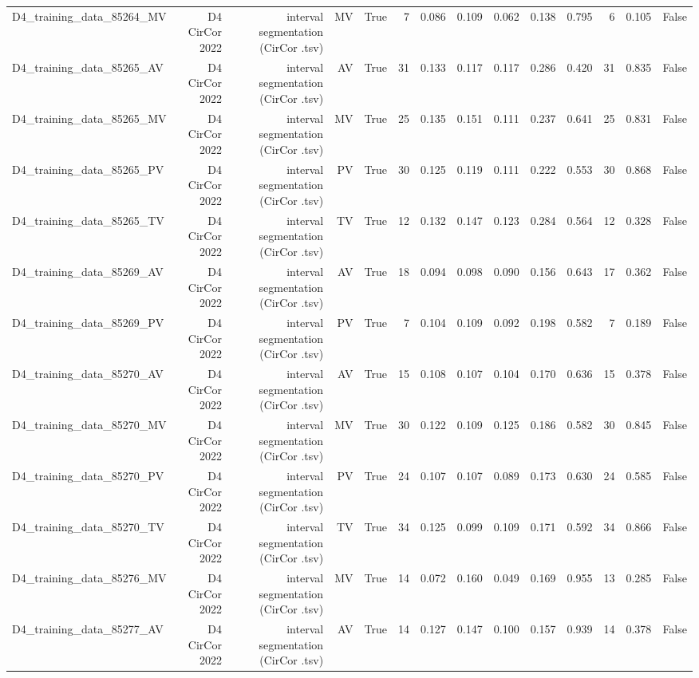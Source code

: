 \begin{table}[htbp]
\begin{tabular}{lrrrrrrrrrrrrr}
    D4\_training\_data\_85264\_MV & D4 CirCor 2022 & interval segmentation (CirCor .tsv) & MV & True & 7 & 0.086 & 0.109 & 0.062 & 0.138 & 0.795 & 6 & 0.105 & False \\
    D4\_training\_data\_85265\_AV & D4 CirCor 2022 & interval segmentation (CirCor .tsv) & AV & True & 31 & 0.133 & 0.117 & 0.117 & 0.286 & 0.420 & 31 & 0.835 & False \\
    D4\_training\_data\_85265\_MV & D4 CirCor 2022 & interval segmentation (CirCor .tsv) & MV & True & 25 & 0.135 & 0.151 & 0.111 & 0.237 & 0.641 & 25 & 0.831 & False \\
    D4\_training\_data\_85265\_PV & D4 CirCor 2022 & interval segmentation (CirCor .tsv) & PV & True & 30 & 0.125 & 0.119 & 0.111 & 0.222 & 0.553 & 30 & 0.868 & False \\
    D4\_training\_data\_85265\_TV & D4 CirCor 2022 & interval segmentation (CirCor .tsv) & TV & True & 12 & 0.132 & 0.147 & 0.123 & 0.284 & 0.564 & 12 & 0.328 & False \\
    D4\_training\_data\_85269\_AV & D4 CirCor 2022 & interval segmentation (CirCor .tsv) & AV & True & 18 & 0.094 & 0.098 & 0.090 & 0.156 & 0.643 & 17 & 0.362 & False \\
    D4\_training\_data\_85269\_PV & D4 CirCor 2022 & interval segmentation (CirCor .tsv) & PV & True & 7 & 0.104 & 0.109 & 0.092 & 0.198 & 0.582 & 7 & 0.189 & False \\
    D4\_training\_data\_85270\_AV & D4 CirCor 2022 & interval segmentation (CirCor .tsv) & AV & True & 15 & 0.108 & 0.107 & 0.104 & 0.170 & 0.636 & 15 & 0.378 & False \\
    D4\_training\_data\_85270\_MV & D4 CirCor 2022 & interval segmentation (CirCor .tsv) & MV & True & 30 & 0.122 & 0.109 & 0.125 & 0.186 & 0.582 & 30 & 0.845 & False \\
    D4\_training\_data\_85270\_PV & D4 CirCor 2022 & interval segmentation (CirCor .tsv) & PV & True & 24 & 0.107 & 0.107 & 0.089 & 0.173 & 0.630 & 24 & 0.585 & False \\
    D4\_training\_data\_85270\_TV & D4 CirCor 2022 & interval segmentation (CirCor .tsv) & TV & True & 34 & 0.125 & 0.099 & 0.109 & 0.171 & 0.592 & 34 & 0.866 & False \\
    D4\_training\_data\_85276\_MV & D4 CirCor 2022 & interval segmentation (CirCor .tsv) & MV & True & 14 & 0.072 & 0.160 & 0.049 & 0.169 & 0.955 & 13 & 0.285 & False \\
    D4\_training\_data\_85277\_AV & D4 CirCor 2022 & interval segmentation (CirCor .tsv) & AV & True & 14 & 0.127 & 0.147 & 0.100 & 0.157 & 0.939 & 14 & 0.378 & False \\

\end{tabular}
\end{table}
